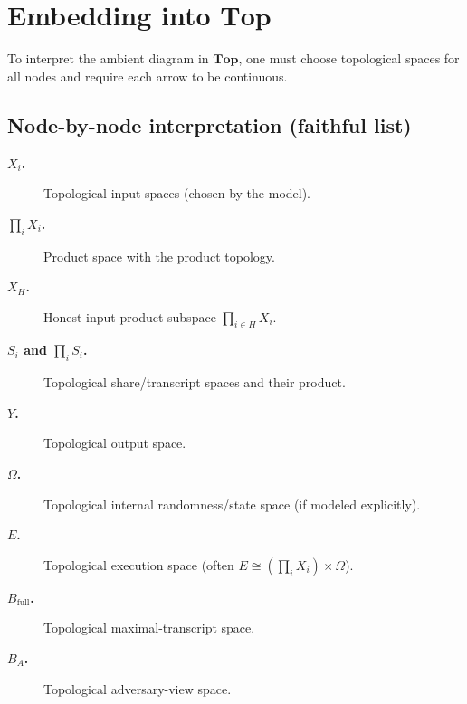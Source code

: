 \documentclass[11pt,a4paper]{article}
\theoremstyle{definition}
\theoremstyle{plain}
\begin{document}
\section{Embedding into \texorpdfstring{$\mathbf{Top}$}{Top}}
\label{sec:top}

To interpret the ambient diagram in $\mathbf{Top}$, one must choose topological spaces for all nodes and require each arrow to be continuous.

\subsection{Node-by-node interpretation (faithful list)}
\begin{description}
    \item[\textbf{$X_i$.}] Topological input spaces (chosen by the model).
    \item[\textbf{$\prod_i X_i$.}] Product space with the product topology.
    \item[\textbf{$X_H$.}] Honest-input product subspace $\prod_{i\in H}X_i$.
    \item[\textbf{$S_i$ and $\prod_i S_i$.}] Topological share/transcript spaces and their product.
    \item[\textbf{$Y$.}] Topological output space.
    \item[\textbf{$\Omega$.}] Topological internal randomness/state space (if modeled explicitly).
    \item[\textbf{$E$.}] Topological execution space (often $E\cong (\prod_i X_i)\times \Omega$).
    \item[\textbf{$B_{\mathrm{full}}$.}] Topological maximal-transcript space.
    \item[\textbf{$B_A$.}] Topological adversary-view space.
\end{description}
\end{document}
